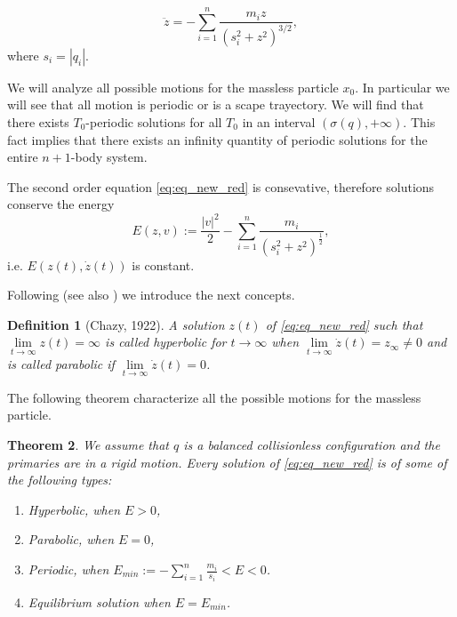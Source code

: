 \documentclass[twoside]{article}
\newtheorem{thm}{Theorem}[section]
\newtheorem{defi}[thm]{Definition}
\theoremstyle{remark}
\begin{document}
\begin{equation}\label{eq:eq_new_red}
 \ddot{z}=-\sum_{i=1}^n\frac{m_iz}{(s_i^2+z^2)^{3/2}},
\end{equation}
where $s_i=|q_i|$.

We will analyze all possible motions for the massless particle $x_0$. In particular we will see that all motion is periodic or is a scape trayectory. We will find that there exists $T_0$-periodic solutions for all $T_0$ in an interval  $(\sigma(q),+\infty)$. This fact implies that there exists an infinity quantity of periodic solutions for the entire $n+1$-body system.





The second order equation \eqref{eq:eq_new_red} is consevative, therefore solutions conserve the energy
\begin{equation}\label{eq:conser.energ}
E(z,v):=\frac{|v|^2}{2}-\sum_{i=1}^{n} \frac{m_i}{\left(s_i^2+z^2\right)^{\frac12}},
\end{equation}
i.e. $E(z(t),\dot{z}(t))$ is constant.



Following \cite{VladimirI.Arnold229} (see also \cite{marchesin2013spatial})  we introduce the next concepts.
\begin{defi}[Chazy, 1922]
 A solution $z(t)$ of \eqref{eq:eq_new_red} such that  $\lim\limits_{t\to\infty}z(t)=\infty$ is called hyperbolic for $t\to \infty$ when $\lim\limits_{t\to\infty}\dot{z}(t)= z_{\infty}\neq 0$ and is called parabolic if $\lim\limits_{t\to\infty}\dot{z}(t)=0$.
\end{defi}






The following theorem characterize all the possible motions for the massless particle.

\begin{thm}\label{thm:prin_ine} We assume that $q$ is a balanced collisionless configuration and the primaries are in a rigid motion. Every solution of \eqref{eq:eq_new_red} is of some of the following types:
\begin{enumerate}
\item\label{1} Hyperbolic, when $E>0$,
\item\label{2} Parabolic, when $E=0$,
\item\label{3} Periodic, when $E_{min}:=-\sum_{i=1}^{n}\frac{m_i}{s_i}<E<0$.
\item\label{4} Equilibrium solution when $E=E_{min}$.
\end{enumerate}
\end{thm}
\end{document}

